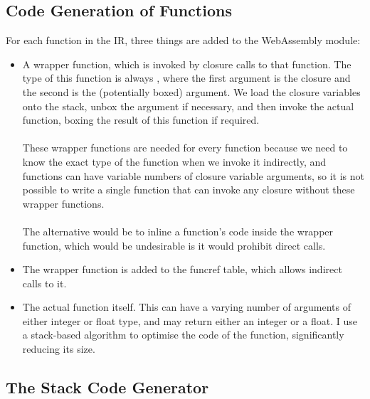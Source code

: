 \subsection{Code Generation of Functions}
For each function in the IR, three things are added to the WebAssembly module:
\begin{itemize}
\item A wrapper function, which is invoked by closure calls to that function. The type of this function is always , where the first argument is the closure and the second is the (potentially boxed) argument. We load the closure variables onto the stack, unbox the argument if necessary, and then invoke the actual function, boxing the result of this function if required.
\\\\
These wrapper functions are needed for every function because we need to know the exact type of the function when we invoke it indirectly, and functions can have variable numbers of closure variable arguments, so it is not possible to write a single function that can invoke any closure without these wrapper functions.
\\\\
The alternative would be to inline a function's code inside the wrapper function, which would be undesirable is it would prohibit direct calls.
\item The wrapper function is added to the funcref table, which allows indirect calls to it.
\item The actual function itself. This can have a varying number of arguments of either integer or float type, and may return either an integer or a float. I use a stack-based algorithm to optimise the code of the function, significantly reducing its size.
\end{itemize}

\subsection{The Stack Code Generator}
%

